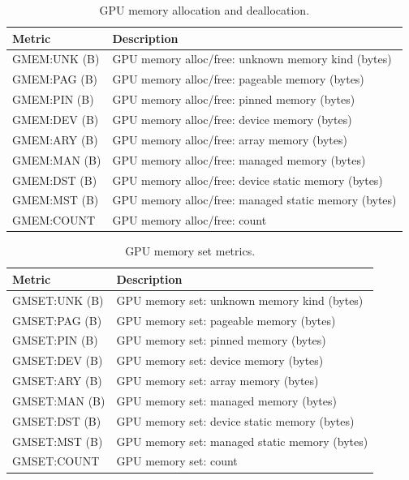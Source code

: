 \begin{table}[t]
\centering
\begin{tabular}{|l|l|}\hline
Metric & Description\\\hline\hline
 GMEM:UNK (B)  &  GPU memory alloc/free: unknown memory kind (bytes)  \\\hline
  GMEM:PAG (B)  &  GPU memory alloc/free: pageable memory (bytes)  \\\hline
  GMEM:PIN (B)  &  GPU memory alloc/free: pinned memory (bytes)  \\\hline
  GMEM:DEV (B)  &  GPU memory alloc/free: device memory (bytes)  \\\hline
  GMEM:ARY (B)  &  GPU memory alloc/free: array memory (bytes)  \\\hline
  GMEM:MAN (B)  &  GPU memory alloc/free: managed memory (bytes)  \\\hline
  GMEM:DST (B)  &  GPU memory alloc/free: device static memory (bytes)  \\\hline
  GMEM:MST (B)  &  GPU memory alloc/free: managed static memory (bytes)  \\\hline
  GMEM:COUNT  &  GPU memory alloc/free: count  \\\hline
\end{tabular}
\caption{GPU memory allocation and deallocation.}
\label{table:gmem}
\end{table}


\begin{table}[t]
\centering
\begin{tabular}{|l|l|}\hline
Metric & Description\\\hline\hline
 GMSET:UNK (B)  &  GPU memory set: unknown memory kind (bytes)  \\\hline
  GMSET:PAG (B)  &  GPU memory set: pageable memory (bytes)  \\\hline
  GMSET:PIN (B)  &  GPU memory set: pinned memory (bytes)  \\\hline
  GMSET:DEV (B)  &  GPU memory set: device memory (bytes)  \\\hline
  GMSET:ARY (B)  &  GPU memory set: array memory (bytes)  \\\hline
  GMSET:MAN (B)  &  GPU memory set: managed memory (bytes)  \\\hline
  GMSET:DST (B)  &  GPU memory set: device static memory (bytes)  \\\hline
  GMSET:MST (B)  &  GPU memory set: managed static memory (bytes)  \\\hline
  GMSET:COUNT  &  GPU memory set: count  \\\hline
\end{tabular}
\caption{GPU memory set metrics.}
\label{table:gmset}
\end{table}

